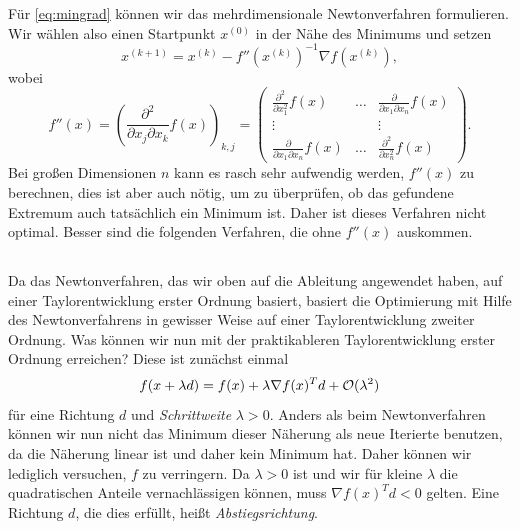 Für \eqref{eq:mingrad} können wir das mehrdimensionale Newtonverfahren
formulieren. Wir wählen also einen Startpunkt $x^{(0)}$ in der Nähe
des Minimums und setzen
\begin{equation}
  x^{(k+1)} = x^{(k)} - f''\left(x^{(k)}\right)^{-1}\nabla f\left(x^{(k)}\right),
\end{equation}
wobei
\begin{equation}
  f''(x) = 
  \left(\frac{\partial^2}{\partial x_j\partial x_k}f(x)\right)_{k,j} = 
  \begin{pmatrix}
    \frac{\partial^2}{\partial x_1^2}f(x) & \ldots &
    \frac{\partial}{\partial x_1\partial x_n}f(x)\\
    \vdots               &        & \vdots \\
    \frac{\partial}{\partial x_1\partial x_n}f(x) & \ldots &
    \frac{\partial^2}{\partial x_n^2}f(x)
  \end{pmatrix}.
\end{equation}
Bei großen Dimensionen $n$ kann es rasch sehr aufwendig werden,
$f''(x)$ zu berechnen, dies ist aber auch nötig, um zu überprüfen,
ob das gefundene Extremum auch tatsächlich ein Minimum ist. Daher
ist dieses Verfahren nicht optimal. Besser sind die folgenden
Verfahren, die ohne $f''(x)$ auskommen.

\subsection{}

Da das Newtonverfahren, das wir oben auf die Ableitung angewendet
haben, auf einer Taylorentwicklung erster Ordnung
basiert, basiert die Optimierung mit Hilfe des Newtonverfahrens in
gewisser Weise auf einer Taylorentwicklung zweiter Ordnung. Was können
wir nun mit der praktikableren Taylorentwicklung erster Ordnung
erreichen? Diese ist zunächst einmal
\begin{equation}
  \label{eq:steepestdescentexpand}
  f(x + \lambda d) = f(x) + \lambda \nabla f(x)^Td + \mathcal O(\lambda^2)
\end{equation}
für eine Richtung $d$ und \emph{Schrittweite} $\lambda > 0$.  Anders
als beim Newtonverfahren können wir nun nicht das Minimum dieser
Näherung als neue Iterierte benutzen, da die Näherung linear ist und
daher kein Minimum hat. Daher können wir lediglich versuchen, $f$ zu
verringern. Da $\lambda>0$ ist und wir für kleine $\lambda$ die
quadratischen Anteile vernachlässigen können, muss $\nabla f(x)^Td < 0$
gelten. Eine Richtung $d$, die dies erfüllt, heißt
\emph{Abstiegsrichtung}.

